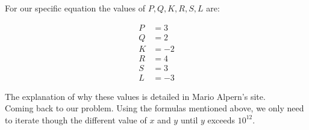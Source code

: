 For our specific equation the values of $P,Q,K,R,S,L$ are:

\begin{align*}
    P &= 3 \\
    Q &= 2 \\
    K &= -2 \\
    R &= 4 \\
    S &= 3 \\
    L &= -3
\end{align*}

The explanation of why these values is detailed in Mario Alpern's site.\\

Coming back to our problem. Using the formulas mentioned above, we only need to iterate though the different value of $x$ and $y$ until $y$ exceeds $10^{12}$.

